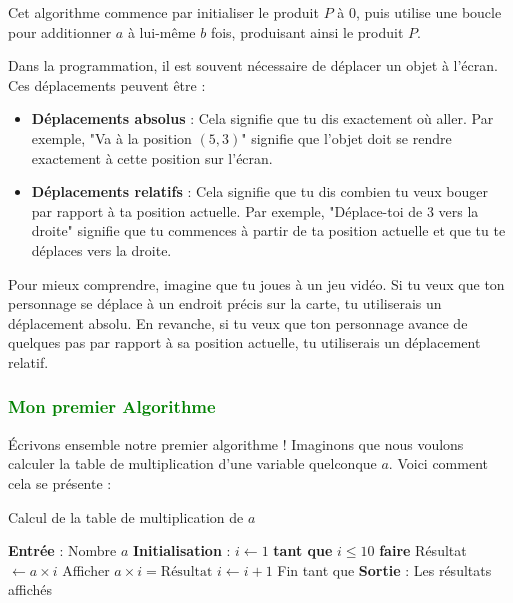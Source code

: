 \documentclass{article}
\begin{document}
Cet algorithme commence par initialiser le produit \( P \) à 0, puis utilise une boucle pour additionner \( a \) à lui-même \( b \) fois, produisant ainsi le produit \( P \).

\vspace{0.15}

Dans la programmation, il est souvent nécessaire de déplacer un objet à l'écran. Ces déplacements peuvent être :

\begin{tcolorbox}[colback=red!10!white, colframe=red!75!black, title=\textcolor{white}{Définitions}]
\begin{itemize}
    \item \textbf{Déplacements absolus} : Cela signifie que tu dis exactement où aller. Par exemple, "Va à la position \( (5, 3) \)" signifie que l'objet doit se rendre exactement à cette position sur l'écran.
    \item \textbf{Déplacements relatifs} : Cela signifie que tu dis combien tu veux bouger par rapport à ta position actuelle. Par exemple, "Déplace-toi de 3 vers la droite" signifie que tu commences à partir de ta position actuelle et que tu te déplaces vers la droite.
\end{itemize}
\end{tcolorbox}

Pour mieux comprendre, imagine que tu joues à un jeu vidéo. Si tu veux que ton personnage se déplace à un endroit précis sur la carte, tu utiliserais un déplacement absolu. En revanche, si tu veux que ton personnage avance de quelques pas par rapport à sa position actuelle, tu utiliserais un déplacement relatif.

\subsubsection{\textcolor{green}{Mon premier Algorithme}}

Écrivons ensemble notre premier algorithme ! Imaginons que nous voulons calculer la table de multiplication d'une variable quelconque \( a \). Voici comment cela se présente :

\begin{tcolorbox}[colback=brown!10!white, colframe=brown!75!black, title=\textcolor{white}{Mon premier Algorithme}]

\begin{algorithm}[H]
    \caption{Calcul de la table de multiplication de \( a \)}
    \begin{algorithmic}[1]
        \State \textbf{Entrée} : Nombre \( a \)
        \State \textbf{Initialisation} : \( i \gets 1 \)
        \State \textbf{tant que}  \( i \leq 10 \) \textbf{faire} 
            \State Résultat \( \gets a \times i \)
            \State Afficher \( a \times i = \text{Résultat} \)
            \State \( i \gets i + 1 \)
        \State Fin tant que
        \State \textbf{Sortie} : Les résultats affichés
    \end{algorithmic}
\end{algorithm}
\end{tcolorbox}
\end{document}
